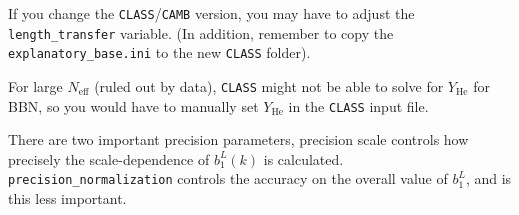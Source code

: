 \documentclass[prd, notitlepage, nofootinbib, 10pt]{revtex4-1}
\begin{document}
If you change the \texttt{CLASS}/\texttt{CAMB} version, you may have to adjust the \texttt{length\_transfer} variable. (In addition, remember to copy the \texttt{explanatory\_base.ini} to the new \texttt{CLASS} folder).

For large $N_\textrm{eﬀ}$ (ruled out by data), \texttt{CLASS} might not be able to solve for $Y_\textrm{He}$ for BBN, so you would have to manually set $Y_\textrm{He}$ in the \texttt{CLASS} input ﬁle.

There are two important precision parameters, precision scale controls how precisely the scale-dependence of
$b_1^L (k)$ is calculated. \texttt{precision\_normalization} controls the accuracy on the overall value of $b_1^L$, and is this less important.
\end{document}
